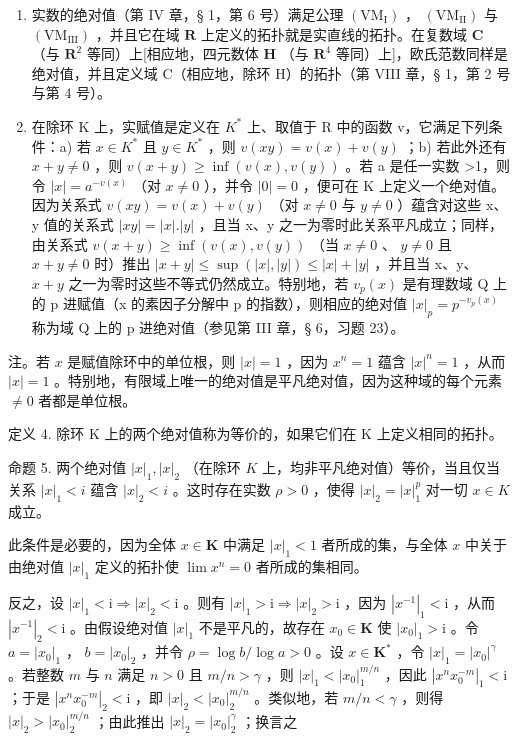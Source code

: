 \begin{enumerate}
\def\labelenumi{\arabic{enumi})}
\setcounter{enumi}{1}
\item
  实数的绝对值（第 IV 章，§ 1，第 6 号）满足公理 \((\mathrm{VM}_{\mathrm{I}})\) ， \((\mathrm{VM}_{\mathrm{II}})\) 与 \((\mathrm{VM}_{\mathrm{III}})\) ，并且它在域 \(\mathbf{R}\) 上定义的拓扑就是实直线的拓扑。在复数域 \(\mathbf{C}\) （与 \(\mathbf{R}^2\) 等同）上{[}相应地，四元数体 \(\mathbf{H}\) （与 \(\mathbf{R}^4\) 等同）上{]}，欧氏范数同样是绝对值，并且定义域 C（相应地，除环 H）的拓扑（第 VIII 章，§ 1，第 2 号与第 4 号）。
\item
  在除环 K 上，实赋值是定义在 \(K^{*}\) 上、取值于 R 中的函数 v，它满足下列条件：a) 若 \(x \in K^{*}\) 且 \(y \in K^{*}\) ，则 \(v(xy) = v(x) + v(y)\) ；b) 若此外还有 \(x + y \neq 0\) ，则 \(v(x + y) \geqslant \inf(v(x), v(y))\) 。若 a 是任一实数 \textgreater1，则令 \(|x| = a^{-v(x)}\) （对 \(x \neq 0\) ），并令 \(|0| = 0\) ，便可在 K 上定义一个绝对值。因为关系式 \(v(xy) = v(x) + v(y)\) （对 \(x \neq 0\) 与 \(y \neq 0\) ）蕴含对这些 x、y 值的关系式 \(|xy| = |x|.|y|\) ，且当 x、y 之一为零时此关系平凡成立；同样，由关系式 \(v(x + y) \geqslant \inf(v(x), v(y))\) （当 \(x \neq 0\) 、 \(y \neq 0\) 且 \(x + y \neq 0\) 时）推出 \(|x + y| \leqslant \sup(|x|, |y|) \leqslant |x| + |y|\) ，并且当 x、y、 \(x + y\) 之一为零时这些不等式仍然成立。特别地，若 \(v_{p}(x)\) 是有理数域 Q 上的 p 进赋值（x 的素因子分解中 p 的指数），则相应的绝对值 \(|x|_{p} = p^{-v_{p}(x)}\) 称为域 Q 上的 p 进绝对值（参见第 III 章，§ 6，习题 23）。
\end{enumerate}

注。若 \(x\) 是赋值除环中的单位根，则 \(|x| = 1\) ，因为 \(x^n = 1\) 蕴含 \(|x|^n = 1\) ，从而 \(|x| = 1\) 。特别地，有限域上唯一的绝对值是平凡绝对值，因为这种域的每个元素 \(\neq 0\) 者都是单位根。

定义 4. 除环 K 上的两个绝对值称为等价的，如果它们在 K 上定义相同的拓扑。

命题 5. 两个绝对值 \(|x|_1, |x|_2\) （在除环 \(K\) 上，均非平凡绝对值）等价，当且仅当关系 \(|x|_1 < i\) 蕴含 \(|x|_2 < i\) 。这时存在实数 \(\rho > 0\) ，使得 \(|x|_2 = |x|_1^p\) 对一切 \(x \in K\) 成立。

此条件是必要的，因为全体 \(x \in \mathbf{K}\) 中满足 \(|x|_1 < 1\) 者所成的集，与全体 \(x\) 中关于由绝对值 \(|x|_1\) 定义的拓扑使 \(\lim x^n = 0\) 者所成的集相同。

反之，设 \(|x|_1 < \mathrm{i} \Longrightarrow |x|_2 < \mathrm{i}\) 。则有 \(|x|_1 > \mathrm{i} \Longrightarrow |x|_2 > \mathrm{i}\) ，因为 \(|x^{-1}|_1 < \mathrm{i}\) ，从而 \(|x^{-1}|_2 < \mathrm{i}\) 。由假设绝对值 \(|x|_1\) 不是平凡的，故存在 \(x_0 \in \mathbf{K}\) 使 \(|x_0|_1 > \mathrm{i}\) 。令 \(a = |x_0|_1\) ， \(b = |x_0|_2\) ，并令 \(\rho = \log b / \log a > 0\) 。设 \(x \in \mathbf{K}^*\) ，令 \(|x|_1 = |x_0|^{\gamma}\) 。若整数 \(m\) 与 \(n\) 满足 \(n > 0\) 且 \(m/n > \gamma\) ，则 \(|x|_1 < |x_0|_1^{m/n}\) ，因此 \(|x^n x_0^{-m}|_1 < \mathrm{i}\) ；于是 \(|x^n x_0^{-m}|_2 < \mathrm{i}\) ，即 \(|x|_2 < |x_0|_2^{m/n}\) 。类似地，若 \(m/n < \gamma\) ，则得 \(|x|_2 > |x_0|_2^{m/n}\) ；由此推出 \(|x|_2 = |x_0|_2^\gamma\) ；换言之

